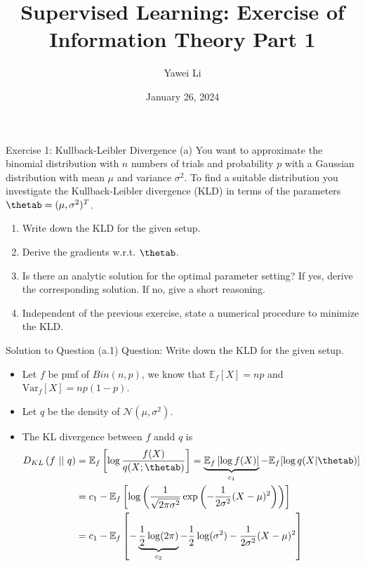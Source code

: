 \documentclass[aspectratio=169]{beamer}
\title[]{\textbf{Supervised Learning: Exercise of \\ Information Theory Part 1}}
\author{Yawei Li}
\institute[LMU]
{
\\
  \texttt{yawei.li@stat.uni-muenchen.de}
}
\date{January 26, 2024}
\newcommand{\kld}[1]{D_{KL}\left(#1\right)}
\newcommand{\Ef}{\mathbb{E}_f}
\newcommand{\Varf}{\mathrm{Var}_f}
\begin{document}
\begin{frame}
\titlepage

\end{frame}


\begin{frame}{Exercise 1: Kullback-Leibler Divergence}
	(a) You want to approximate the binomial distribution with $n$ numbers of trials and probability $p$ with a Gaussian distribution with mean $\mu$ and variance $\sigma^2$. To find a suitable distribution you investigate the Kullback-Leibler divergence (KLD) in terms of the parameters $\thetab = (\mu, \sigma^2)^T$.
	\begin{enumerate}
		\item Write down the KLD for the given setup.
		\item Derive the gradients w.r.t. $\thetab$.
		\item Is there an analytic solution for the optimal parameter setting? If yes, derive the corresponding solution. If no, give a short reasoning.
		\item Independent of the previous exercise, state a numerical procedure to minimize the KLD.
	\end{enumerate}
\end{frame}

\begin{frame}{Solution to Question (a.1)}
	\small
	Question: Write down the KLD for the given setup.
	
	\begin{itemize}
		\item Let $f$ be pmf of $Bin(n, p)$, we know that $\Ef[X] = np$ and $\Varf[X] = np (1 - p)$.
		\item Let $q$ be the density of $\mathcal{N}(\mu, \sigma^2)$.
		\item The KL divergence between $f$ andd $q$ is
		\begin{align*}
			\kld{f \ || \ q} 
			&= \Ef \left[ \log \frac{f(X)}{q(X; \thetab)} \right] = \underbrace{\Ef \left[ \log f(X) \right]}_{c_1} - \Ef [\log q(X|\thetab)] \\
			&= c_1 - \Ef \left[ \log \left( \frac{1}{\sqrt{2 \pi \sigma^2}} \exp \left( - \frac{1}{2\sigma^2} (X - \mu)^2 \right)  \right) \right] \\
			&= c_1 - \Ef \left[ - \underbrace{\frac{1}{2} \log(2\pi)}_{c_2} - \frac{1}{2} \log (\sigma^2) - \frac{1}{2\sigma^2} (X - \mu)^2 \right]
		\end{align*}
	\end{itemize}
	
\end{frame}
\end{document}
